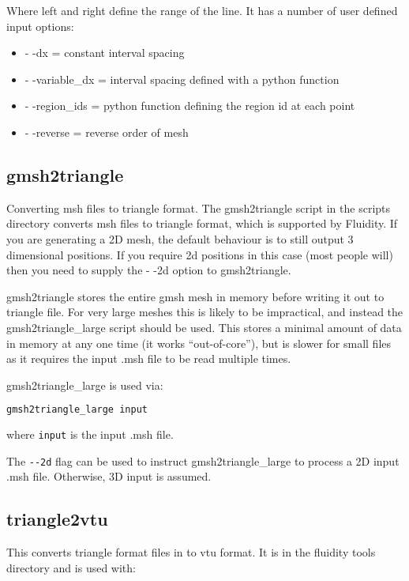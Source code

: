 Where left and right define the range of the line. It has a number of user defined input options:

\begin{itemize}
\item - -dx = constant interval spacing
\item - -variable\_dx = interval spacing defined with a python function
\item - -region\_ids = python function defining the region id at each point
\item - -reverse = reverse order of mesh
\end{itemize}

\subsection{gmsh2triangle}
Converting msh files to triangle format. The gmsh2triangle script in the scripts
directory converts msh files to triangle format, which is supported by Fluidity.
If you are generating a 2D mesh, the default behaviour is to still
output 3 dimensional positions. If you require 2d positions in this case (most
people will) then you need to supply the - -2d option to gmsh2triangle.

gmsh2triangle stores the entire gmsh mesh in memory before writing it out to
triangle file. For very large meshes this is likely to be impractical,
and instead the gmsh2triangle\_large script should be used. This stores a minimal
amount of data in memory at any one time (it works ``out-of-core''), but
is slower for small files as it requires the input .msh file to be read multiple
times.

gmsh2triangle\_large is used via:

\begin{lstlisting}[language = Bash]
gmsh2triangle_large input
\end{lstlisting}

where \lstinline[language = Bash]*input* is the input .msh file.

The \lstinline[language = Bash]+--2d+ flag can be used to instruct gmsh2triangle\_large
to process a 2D input .msh file. Otherwise, 3D input is assumed.

\subsection{triangle2vtu}
This converts triangle format files in to vtu format. It is in the fluidity tools directory and is used with:

